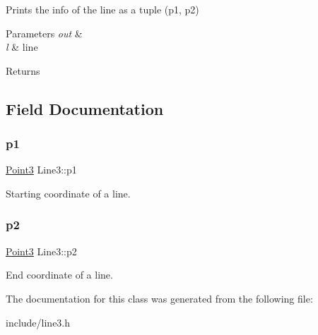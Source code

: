 Prints the info of the line as a tuple (p1, p2) 


\begin{DoxyParams}{Parameters}
{\em out} & \\
\hline
{\em l} & line \\
\hline
\end{DoxyParams}
\begin{DoxyReturn}{Returns}

\end{DoxyReturn}


\subsection{Field Documentation}
\mbox{\label{class_line3_a3847fbeaf089c44637e2e52c0ef1ea5a}} 
\subsubsection{\texorpdfstring{p1}{p1}}
{\footnotesize\ttfamily \mbox{\hyperlink{class_point3}{Point3}} Line3\+::p1}



Starting coordinate of a line. 

\mbox{\label{class_line3_a4b75271d054d200148a5d0ddb2ca1795}} 
\subsubsection{\texorpdfstring{p2}{p2}}
{\footnotesize\ttfamily \mbox{\hyperlink{class_point3}{Point3}} Line3\+::p2}



End coordinate of a line. 



The documentation for this class was generated from the following file\+:\begin{DoxyCompactItemize}
\item 
include/line3.\+h\end{DoxyCompactItemize}

